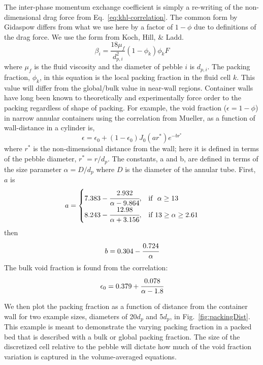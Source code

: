 The inter-phase momentum exchange coefficient is simply a re-writing of the non-dimensional drag force from Eq.~\ref{eq:khl-correlation}. The common form by Gidaspow\cite{gidaspow1994multiphase} differs from what we use here by a factor of $1-\phi$ due to definitions of the drag force. We use the form from Koch, Hill, \& Ladd.\cite{Hoef2005,Benyahia2006}
\begin{equation}\label{eq:interphase-momentum}
	\beta_{i} = \frac{18\mu_f}{d_{p,i}^2}(1-\phi_k)\phi_k F
\end{equation}
where $\mu_f$ is the fluid viscosity and the diameter of pebble $i$ is $d_{p,i}$. The packing fraction, $\phi_k$, in this equation is the local packing fraction in the fluid cell $k$. This value will differ from the global/bulk value in near-wall regions. Container walls have long been known to theoretically and experimentally force order to the packing regardless of shape of packing.\cite{Hunt1990,Benenati1962,Baird1958} For example, the void fraction ($\epsilon = 1-\phi$) in narrow annular containers using the correlation from Mueller, as a function of wall-distance in a cylinder is,\cite{Mueller1999}
\[
\epsilon = \epsilon_0 + (1-\epsilon_0)J_0(ar^*)e^{-br^*}
\]
where $r^*$ is the non-dimensional distance from the wall; here it is defined in terms of the pebble diameter, $r^* = r/d_p$. The constants, a and b, are defined in terms of the size parameter $\alpha = D/d_p$ where $D$ is the diameter of the annular tube. First, $a$ is
\[
    a= 
\begin{cases}
    7.383 - \cfrac{2.932}{\alpha - 9.864}, & \text{if }~ \alpha \geq 13\\
    8.243 - \cfrac{12.98}{\alpha + 3.156}, & \text{if} ~13 \geq \alpha \geq 2.61
\end{cases}
\]
then
\[
b = 0.304 - \cfrac{0.724}{\alpha}
\]
The bulk void fraction is found from the correlation:
\[
\epsilon_0 = 0.379 + \cfrac{0.078}{\alpha - 1.8}
\]

We then plot the packing fraction as a function of distance from the container wall for two example sizes, diameters of 20$d_p$ and 5$d_p$, in Fig.~\ref{fig:packingDist}. This example is meant to demonstrate the varying packing fraction in a packed bed that is described with a bulk or global packing fraction. The size of the discretized cell relative to the pebble will dictate how much of the void fraction variation is captured in the volume-averaged equations.

